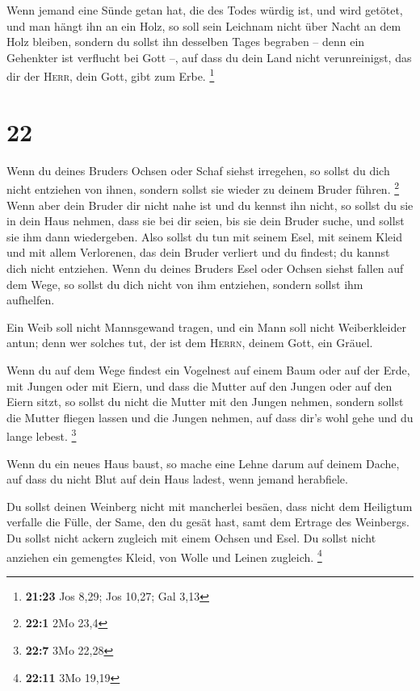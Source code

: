  Wenn jemand eine Sünde getan hat, die des Todes würdig
ist, und wird getötet, und man hängt ihn an ein Holz,  so
soll sein Leichnam nicht über Nacht an dem Holz bleiben, sondern du
sollst ihn desselben Tages begraben -- denn ein Gehenkter ist verflucht
bei Gott --, auf dass du dein Land nicht verunreinigst, das dir der
\textsc{Herr}, dein Gott, gibt zum Erbe. \footnote{\textbf{21:23} Jos
  8,29; Jos 10,27; Gal 3,13}

\hypertarget{section-4}{%
\section{22}\label{section-4}}

 Wenn du deines Bruders Ochsen oder Schaf siehst
irregehen, so sollst du dich nicht entziehen von ihnen, sondern sollst
sie wieder zu deinem Bruder führen. \footnote{\textbf{22:1} 2Mo 23,4}
 Wenn aber dein Bruder dir nicht nahe ist und du kennst
ihn nicht, so sollst du sie in dein Haus nehmen, dass sie bei dir seien,
bis sie dein Bruder suche, und sollst sie ihm dann wiedergeben.
 Also sollst du tun mit seinem Esel, mit seinem Kleid und
mit allem Verlorenen, das dein Bruder verliert und du findest; du kannst
dich nicht entziehen.  Wenn du deines Bruders Esel oder
Ochsen siehst fallen auf dem Wege, so sollst du dich nicht von ihm
entziehen, sondern sollst ihm aufhelfen.

 Ein Weib soll nicht Mannsgewand tragen, und ein Mann soll
nicht Weiberkleider antun; denn wer solches tut, der ist dem
\textsc{Herrn}, deinem Gott, ein Gräuel.

 Wenn du auf dem Wege findest ein Vogelnest auf einem Baum
oder auf der Erde, mit Jungen oder mit Eiern, und dass die Mutter auf
den Jungen oder auf den Eiern sitzt, so sollst du nicht die Mutter mit
den Jungen nehmen,  sondern sollst die Mutter fliegen
lassen und die Jungen nehmen, auf dass dir's wohl gehe und du lange
lebest. \footnote{\textbf{22:7} 3Mo 22,28}

 Wenn du ein neues Haus baust, so mache eine Lehne darum
auf deinem Dache, auf dass du nicht Blut auf dein Haus ladest, wenn
jemand herabfiele.

 Du sollst deinen Weinberg nicht mit mancherlei besäen,
dass nicht dem Heiligtum verfalle die Fülle, der Same, den du gesät
hast, samt dem Ertrage des Weinbergs.  Du sollst nicht
ackern zugleich mit einem Ochsen und Esel.  Du sollst
nicht anziehen ein gemengtes Kleid, von Wolle und Leinen zugleich.
\footnote{\textbf{22:11} 3Mo 19,19}

